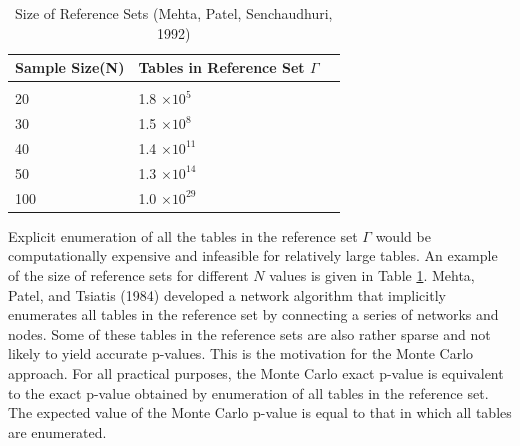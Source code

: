 \documentclass[12pt,oneside]{report}
\theoremstyle{definition}
\theoremstyle{mystyle}
\begin{document}


\begin{table}[h!]
	\label{table:results}
	\begin{center}
		\caption{Size of Reference Sets (Mehta, Patel, Senchaudhuri, 1992)}
		\begin{tabular}{ l l l}
			\hline
			Sample Size(N) & \hspace{25mm}Tables in Reference Set $\Gamma$&  \\ \hline\hline
			&\\
			20 & \hspace{25mm} 1.8 $\times 10^{5}$& \\
			30 & \hspace{25mm} 1.5 $\times 10^{8}$ &\\
			40 & \hspace{25mm} 1.4 $\times 10^{11}$ &\\
			50 & \hspace{25mm} 1.3 $\times 10^{14}$ &\\
			100 & \hspace{25mm} 1.0 $\times 10^{29}$ &\\
			\hline
		\end{tabular}
		\label{table:ref}
	\end{center}
\end{table}	

Explicit enumeration of all the tables in the reference set $\Gamma$ would be computationally expensive and infeasible for relatively large tables. An example of the size of reference sets for different $N$ values is given in Table \ref{table:ref}. Mehta, Patel, and Tsiatis (1984) developed a network algorithm that implicitly enumerates all tables in the reference set by connecting  a series of networks and nodes. Some of these tables in the reference sets are also rather sparse and not likely   to yield accurate p-values. This is the motivation for the Monte Carlo approach. For all practical purposes, the Monte Carlo exact  p-value is equivalent to the exact p-value obtained by enumeration of all tables in the reference set. The expected value of the Monte Carlo p-value is equal to that in which all tables are enumerated.
\end{document}
